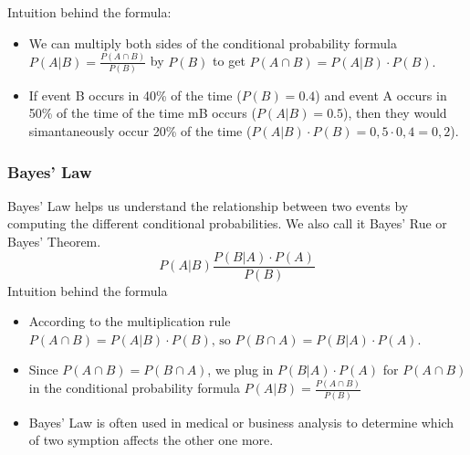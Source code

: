 \documentclass{article}
\begin{document}
Intuition behind the formula:
\begin{itemize}
  \item We can multiply both sides of the conditional probability formula
    $P(A|B)=\frac{P(A\cap B)}{P(B)}$ by $P(B)$ to get $P(A\cap B)=P(A|B)\cdot
    P(B).$ \item If event B occurs in 40\% of the time ($P(B)=0.4$) and event A
    occurs
    in 50\% of the time of the time mB occurs ($P(A|B)=0.5$), then they would
    simantaneously occur 20\% of the time ($P(A|B)\cdot P(B)=0,5\cdot 0,4 =
    0,2$).
\end{itemize}

\subsubsection{Bayes' Law}
Bayes' Law helps us understand the relationship between two events by computing
the different conditional probabilities. We also call it Bayes' Rue or Bayes'
Theorem.
\[ P(A|B)\frac{P(B|A)\cdot P(A)}{P(B)} \]
Intuition behind the formula
\begin{itemize}
  \item According to the multiplication rule $P(A\cap B)= P(A|B) \cdot P(B)
    \text{, so } P(B \cap A) = P(B|A)\cdot P(A)$.
  \item Since $P(A \cap B) = P(B\cap A)$, we plug in $P(B|A) \cdot P(A)$ for
    $P(A\cap B)$ in the conditional probability formula $P(A|B)=\frac{P(A\cap
    B)}{P(B)}$
  \item Bayes' Law is often used in medical or business analysis to determine
    which of two symption affects the other one more.
\end{itemize}
\end{document}
